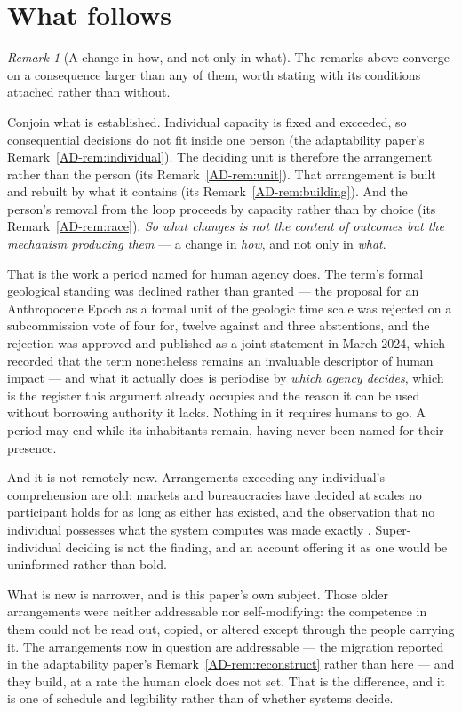 \documentclass[11pt,a4paper]{article}
\theoremstyle{remark}
\newtheorem{remark}[definition]{Remark}
\begin{document}
\section{What follows}\label{sec:follows}
\begin{remark}[A change in how, and not only in what]\label{rem:how}
The remarks above converge on a consequence larger than any of them, worth stating with its conditions
attached rather than without.

Conjoin what is established. Individual capacity is fixed and exceeded, so consequential
decisions do not fit inside one person (the adaptability paper's Remark~\ref{AD-rem:individual}). The deciding unit is therefore the
arrangement rather than the person (its Remark~\ref{AD-rem:unit}). That arrangement is built and rebuilt by
what it contains (its Remark~\ref{AD-rem:building}). And the person's removal from the loop proceeds by
capacity rather than by choice (its Remark~\ref{AD-rem:race}). \emph{So what changes is not the content of
outcomes but the mechanism producing them} --- a change in \emph{how}, and not only in \emph{what}.

That is the work a period named for human agency does. The term's formal geological standing was
declined rather than granted --- the proposal for an Anthropocene Epoch as a formal unit of the geologic
time scale was rejected on a subcommission vote of four for, twelve against and three abstentions, and
the rejection was approved and published as a joint statement in March 2024, which recorded that the
term nonetheless remains an invaluable descriptor of human impact \citep{iugs2024} --- and what it actually does is periodise by \emph{which agency decides},
which is the register this argument already occupies and the reason it can be used without borrowing
authority it lacks. Nothing in it requires humans to go. A period may end while its inhabitants
remain, having never been named for their presence.

And it is not remotely new. Arrangements exceeding any individual's comprehension are old:
markets and bureaucracies have decided at scales no participant holds for as long as either has existed,
and the observation that no individual possesses what the system computes was made exactly
\citep{hayek1945}. Super-individual deciding is not the finding, and an account offering it as one
would be uninformed rather than bold.

What is new is narrower, and is this paper's own subject. Those older arrangements were neither
addressable nor self-modifying: the competence in them could not be read out, copied, or altered except
through the people carrying it. The arrangements now in question are addressable --- the
migration reported in the adaptability paper's Remark~\ref{AD-rem:reconstruct} rather than here ---
and they build, at a rate the human clock does not set. That is the
difference, and it is one of schedule and legibility rather than of whether systems decide.


\end{remark}
\end{document}
